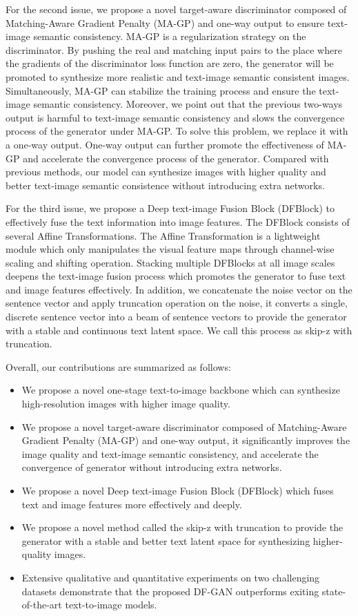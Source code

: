 \documentclass[10pt,twocolumn,letterpaper]{article}
\begin{document}
For the second issue, we propose a novel target-aware discriminator composed of Matching-Aware Gradient Penalty (MA-GP) and one-way output to ensure text-image semantic consistency. 
MA-GP is a regularization strategy on the discriminator. By pushing the real and matching input pairs to the place where the gradients of the discriminator loss function are zero, the generator will be promoted to synthesize more realistic and text-image semantic consistent images.
Simultaneously, MA-GP can stabilize the training process and ensure the text-image semantic consistency.
Moreover, we point out that the previous two-ways output is harmful to text-image semantic consistency and slows the convergence process of the generator under MA-GP.
To solve this problem, we replace it with a one-way output. 
One-way output can further promote the effectiveness of MA-GP and accelerate the convergence process of the generator.
Compared with previous methods, our model can synthesize images with higher quality and better text-image semantic consistence without introducing extra networks.

For the third issue, we propose a Deep text-image Fusion Block (DFBlock) to effectively fuse the text information into image features. 
The DFBlock consists of several Affine Transformations.
The Affine Transformation is a lightweight module which only manipulates the visual feature maps through channel-wise scaling and shifting operation.
Stacking multiple DFBlocks at all image scales deepens the text-image fusion process which promotes the generator to fuse text and image features effectively.
In addition, we concatenate the noise vector on the sentence vector and apply truncation operation on the noise, it converts a single, discrete sentence vector into a beam of sentence vectors to provide the generator with a stable and continuous text latent space.
We call this process as skip-z with truncation.

Overall, our contributions are summarized as follows:
\begin{itemize}[leftmargin=*]
\item We propose a novel one-stage text-to-image backbone which can synthesize high-resolution images with higher image quality.
\item We propose a novel target-aware discriminator composed of Matching-Aware Gradient Penalty (MA-GP) and one-way output, it significantly improves the image quality and text-image semantic consistency, and accelerate the convergence of generator without introducing extra networks. 
\item We propose a novel Deep text-image Fusion Block (DFBlock) which fuses text and image features more effectively and deeply.
\item We propose a novel method called the skip-z with truncation to provide the generator with a stable and better text latent space for synthesizing higher-quality images.
\item Extensive qualitative and quantitative experiments on two challenging datasets demonstrate that the proposed DF-GAN outperforms exiting state-of-the-art text-to-image models.
\end{itemize}
\end{document}
